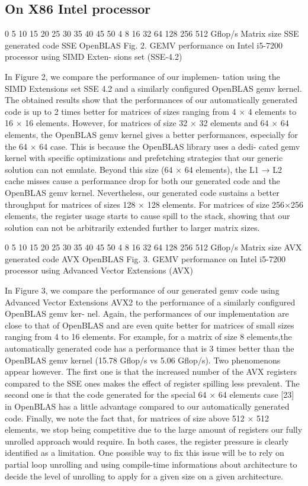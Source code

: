 \documentclass[../../main.tex]{subfiles}
\begin{document}
\subsection{On X86 Intel processor}

0
5
10
15
20
25
30
35
40
45
50
4 8 16 32 64 128 256 512
Gflop/s
Matrix size
SSE generated code
SSE OpenBLAS
Fig. 2. GEMV performance on Intel i5-7200 processor using SIMD Exten-
sions set (SSE-4.2)

In Figure 2, we compare the performance of our implemen-
tation using the SIMD Extensions set SSE 4.2 and a similarly
configured OpenBLAS gemv kernel. The obtained results show
that the performances of our automatically generated code is
up to 2 times better for matrices of sizes ranging from 4 × 4
elements to 16 × 16 elements. However, for matrices of size
32 × 32 elements and 64 × 64 elements, the OpenBLAS gemv
kernel gives a better performances, especially for the 64 × 64
case. This is because the OpenBLAS library uses a dedi-
cated gemv kernel with specific optimizations and prefetching
strategies that our generic solution can not emulate. Beyond
this size (64 × 64 elements), the L1 → L2 cache misses
cause a performance drop for both our generated code and
the OpenBLAS gemv kernel. Nevertheless, our generated code
sustains a better throughput for matrices of sizes 128 × 128
elements. For matrices of size 256×256 elements, the register
usage starts to cause spill to the stack, showing that our
solution can not be arbitrarily extended further to larger matrix
sizes.

0
5
10
15
20
25
30
35
40
45
50
4 8 16 32 64 128 256 512
Gflop/s
Matrix size
AVX generated code
AVX OpenBLAS
Fig. 3. GEMV performance on Intel i5-7200 processor using Advanced Vector
Extensions (AVX)

In Figure 3, we compare the performance of our generated
gemv code using Advanced Vector Extensions AVX2 to the
performance of a similarly configured OpenBLAS gemv ker-
nel. Again, the performances of our implementation are close
to that of OpenBLAS and are even quite better for matrices of
small sizes ranging from 4 to 16 elements. For example, for a
matrix of size 8 elements,the automatically generated code has
a performance that is 3 times better than the OpenBLAS gemv
kernel (15.78 Gflop/s vs 5.06 Gflop/s). Two phenomenons
appear however. The first one is that the increased number
of the AVX registers compared to the SSE ones makes the
effect of register spilling less prevalent. The second one is
that the code generated for the special 64 × 64 elements
case [23] in OpenBLAS has a little advantage compared to
our automatically generated code. Finally, we note the fact
that, for matrices of size above 512 × 512 elements, we stop
being competitive due to the large amount of registers our
fully unrolled approach would require.
In both cases, the register pressure is clearly identified as a
limitation. One possible way to fix this issue will be to rely
on partial loop unrolling and using compile-time informations
about architecture to decide the level of unrolling to apply for
a given size on a given architecture.
\end{document}
